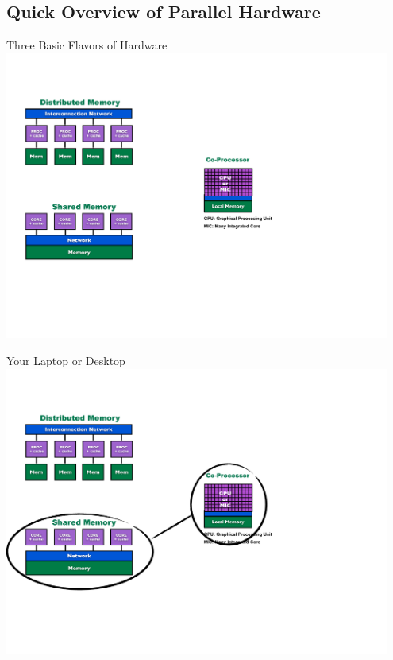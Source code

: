 \subsection{Quick Overview of Parallel Hardware}

\begin{frame}
\begin{block}{Three Basic Flavors of Hardware}
    \includegraphics[width=0.95\textwidth]{../common/pics/ParallelHardware1.pdf}
\end{block}
\end{frame}

\begin{frame}
\begin{block}{Your Laptop or Desktop}
    \includegraphics[width=0.95\textwidth]{../common/pics/ParallelHardware2.pdf}
\end{block}
\end{frame}

